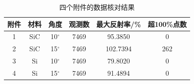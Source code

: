 \begin{table}[htbp]\centering
\caption{四个附件的数据核对结果}\label{tab:quality}
\begin{tabular}{cccccc}
\toprule 附件 & 材料 & 角度 & 观测数 & 最大反射率/\% & 超100\%点数\\\midrule
1 & SiC & 10$^\circ$ & 7469 & 95.3850 & 0 \\
2 & SiC & 15$^\circ$ & 7469 & 102.7394 & 262 \\
3 & Si & 10$^\circ$ & 7469 & 79.8020 & 0 \\
4 & Si & 15$^\circ$ & 7469 & 91.4894 & 0 \\
\bottomrule
\end{tabular}\end{table}
